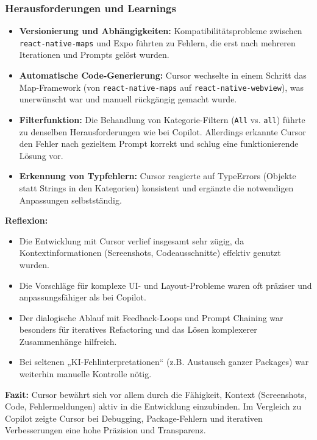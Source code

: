 \subsubsection{Herausforderungen und Learnings}
\begin{itemize}
      \item \textbf{Versionierung und Abhängigkeiten:} Kompatibilitätsprobleme zwischen \texttt{react-native-maps} und Expo führten zu Fehlern, die erst nach mehreren Iterationen und Prompts gelöst wurden.
      \item \textbf{Automatische Code-Generierung:} Cursor wechselte in einem Schritt das Map-Framework (von \texttt{react-native-maps} auf \texttt{react-native-webview}), was unerwünscht war und manuell rückgängig gemacht wurde.
      \item \textbf{Filterfunktion:} Die Behandlung von Kategorie-Filtern (\texttt{All} vs. \texttt{all}) führte zu denselben Herausforderungen wie bei Copilot. Allerdings erkannte Cursor den Fehler nach gezieltem Prompt korrekt und schlug eine funktionierende Lösung vor.
      \item \textbf{Erkennung von Typfehlern:} Cursor reagierte auf TypeErrors (Objekte statt Strings in den Kategorien) konsistent und ergänzte die notwendigen Anpassungen selbstständig.
\end{itemize}

\textbf{Reflexion:}
\begin{itemize}
      \item Die Entwicklung mit Cursor verlief insgesamt sehr zügig, da
            Kontextinformationen (Screenshots, Codeausschnitte) effektiv genutzt wurden.
      \item Die Vorschläge für komplexe UI- und Layout-Probleme waren oft präziser und
            anpassungsfähiger als bei Copilot.
      \item Der dialogische Ablauf mit Feedback-Loops und Prompt Chaining war besonders für
            iteratives Refactoring und das Lösen komplexerer Zusammenhänge hilfreich.
      \item Bei seltenen „KI-Fehlinterpretationen“ (z.B. Austausch ganzer Packages) war
            weiterhin manuelle Kontrolle nötig.
\end{itemize}

\textbf{Fazit:}
Cursor bewährt sich vor allem durch die Fähigkeit, Kontext (Screenshots, Code, Fehlermeldungen) aktiv in die Entwicklung einzubinden. Im Vergleich zu Copilot zeigte Cursor bei Debugging, Package-Fehlern und iterativen Verbesserungen eine hohe Präzision und Transparenz.

